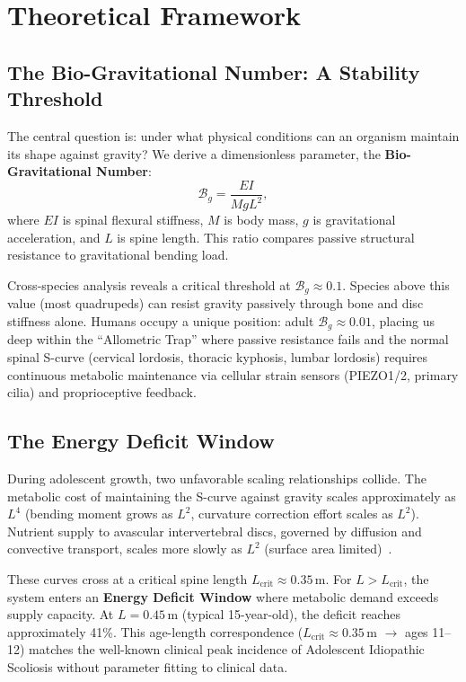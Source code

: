 \section{Theoretical Framework}

\subsection{The Bio-Gravitational Number: A Stability Threshold}

The central question is: under what physical conditions can an organism maintain its shape against gravity? We derive a dimensionless parameter, the \textbf{Bio-Gravitational Number}:
\begin{equation}
\mathcal{B}_g = \frac{EI}{M g L^2},
\label{eq:bg_number}
\end{equation}
where $EI$ is spinal flexural stiffness, $M$ is body mass, $g$ is gravitational acceleration, and $L$ is spine length. This ratio compares passive structural resistance to gravitational bending load.

Cross-species analysis reveals a critical threshold at $\mathcal{B}_g \approx 0.1$. Species above this value (most quadrupeds) can resist gravity passively through bone and disc stiffness alone. Humans occupy a unique position: adult $\mathcal{B}_g \approx 0.01$, placing us deep within the ``Allometric Trap'' where passive resistance fails and the normal spinal S-curve (cervical lordosis, thoracic kyphosis, lumbar lordosis) requires continuous metabolic maintenance via cellular strain sensors (PIEZO1/2, primary cilia) and proprioceptive feedback.

\subsection{The Energy Deficit Window}

During adolescent growth, two unfavorable scaling relationships collide. The metabolic cost of maintaining the S-curve against gravity scales approximately as $L^4$ (bending moment grows as $L^2$, curvature correction effort scales as $L^2$). Nutrient supply to avascular intervertebral discs, governed by diffusion and convective transport, scales more slowly as $L^{2}$ (surface area limited)~\cite{urban2004nutrition, sato2025convective}.

These curves cross at a critical spine length $L_{\mathrm{crit}} \approx 0.35$\,m. For $L > L_{\mathrm{crit}}$, the system enters an \textbf{Energy Deficit Window} where metabolic demand exceeds supply capacity. At $L = 0.45$\,m (typical 15-year-old), the deficit reaches approximately 41\%. This age-length correspondence ($L_{\mathrm{crit}} \approx 0.35$\,m $\to$ ages 11--12) matches the well-known clinical peak incidence of Adolescent Idiopathic Scoliosis without parameter fitting to clinical data.

